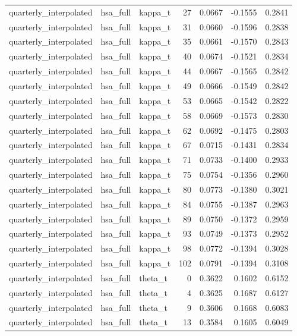 \begin{tabular}{lllrrrr}
quarterly\_interpolated & hsa\_full & kappa\_t & 27 & 0.0667 & -0.1555 & 0.2841 \\
quarterly\_interpolated & hsa\_full & kappa\_t & 31 & 0.0660 & -0.1596 & 0.2838 \\
quarterly\_interpolated & hsa\_full & kappa\_t & 35 & 0.0661 & -0.1570 & 0.2843 \\
quarterly\_interpolated & hsa\_full & kappa\_t & 40 & 0.0674 & -0.1521 & 0.2834 \\
quarterly\_interpolated & hsa\_full & kappa\_t & 44 & 0.0667 & -0.1565 & 0.2842 \\
quarterly\_interpolated & hsa\_full & kappa\_t & 49 & 0.0666 & -0.1549 & 0.2842 \\
quarterly\_interpolated & hsa\_full & kappa\_t & 53 & 0.0665 & -0.1542 & 0.2822 \\
quarterly\_interpolated & hsa\_full & kappa\_t & 58 & 0.0669 & -0.1573 & 0.2830 \\
quarterly\_interpolated & hsa\_full & kappa\_t & 62 & 0.0692 & -0.1475 & 0.2803 \\
quarterly\_interpolated & hsa\_full & kappa\_t & 67 & 0.0715 & -0.1431 & 0.2834 \\
quarterly\_interpolated & hsa\_full & kappa\_t & 71 & 0.0733 & -0.1400 & 0.2933 \\
quarterly\_interpolated & hsa\_full & kappa\_t & 75 & 0.0754 & -0.1356 & 0.2960 \\
quarterly\_interpolated & hsa\_full & kappa\_t & 80 & 0.0773 & -0.1380 & 0.3021 \\
quarterly\_interpolated & hsa\_full & kappa\_t & 84 & 0.0755 & -0.1387 & 0.2963 \\
quarterly\_interpolated & hsa\_full & kappa\_t & 89 & 0.0750 & -0.1372 & 0.2959 \\
quarterly\_interpolated & hsa\_full & kappa\_t & 93 & 0.0749 & -0.1373 & 0.2952 \\
quarterly\_interpolated & hsa\_full & kappa\_t & 98 & 0.0772 & -0.1394 & 0.3028 \\
quarterly\_interpolated & hsa\_full & kappa\_t & 102 & 0.0791 & -0.1394 & 0.3108 \\
quarterly\_interpolated & hsa\_full & theta\_t & 0 & 0.3622 & 0.1602 & 0.6152 \\
quarterly\_interpolated & hsa\_full & theta\_t & 4 & 0.3625 & 0.1687 & 0.6127 \\
quarterly\_interpolated & hsa\_full & theta\_t & 9 & 0.3606 & 0.1668 & 0.6083 \\
quarterly\_interpolated & hsa\_full & theta\_t & 13 & 0.3584 & 0.1605 & 0.6049 \\

\end{tabular}
